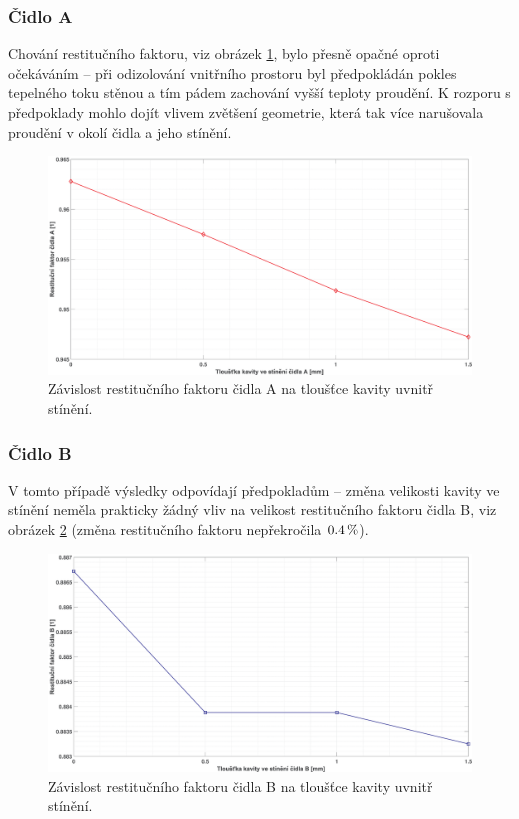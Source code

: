         \subsubsection{Čidlo A}
            Chování restitučního faktoru, viz obrázek \ref{fig:kavita-A-graf}, bylo přesně opačné oproti očekáváním – při odizolování vnitřního prostoru byl předpokládán pokles tepelného toku stěnou a tím pádem zachování vyšší teploty proudění. K rozporu s předpoklady mohlo dojít vlivem zvětšení geometrie, která tak více narušovala proudění v okolí čidla a jeho stínění.
            \begin{figure}[ht!]
                \centering
                \includegraphics*[width=\textwidth]{400_SIMULACE_KONSTRUKCNICH_UPRAV/Grafy/kavita.eps}
                \caption{Závislost restitučního faktoru čidla A na tloušťce kavity uvnitř stínění.}
                \label{fig:kavita-A-graf}
            \end{figure}
        
        \newpage
        
        \subsubsection{Čidlo B}
            V tomto případě výsledky odpovídají předpokladům – změna velikosti kavity ve\,stínění neměla prakticky žádný vliv na velikost restitučního faktoru čidla B, viz obrázek \ref{fig:kavita-B-graf} (změna restitučního faktoru nepřekročila $0.4 \, \%$).
        
            \begin{figure}[ht!]
                \centering
                \includegraphics*[width=\textwidth]{400_SIMULACE_KONSTRUKCNICH_UPRAV/Grafy/kavita_B.eps}
                \caption{Závislost restitučního faktoru čidla B na tloušťce kavity uvnitř stínění.}
                \label{fig:kavita-B-graf}
            \end{figure}
    